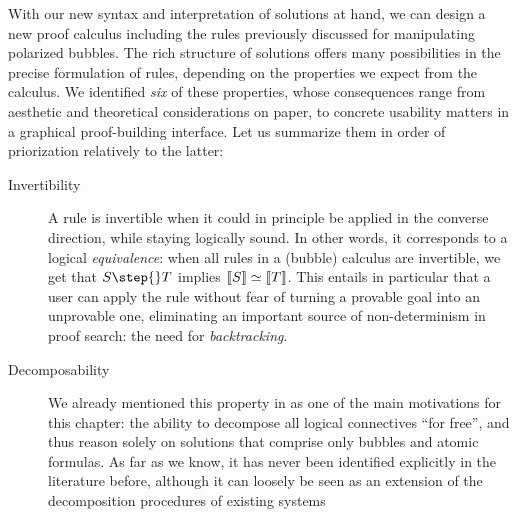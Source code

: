 With our new syntax and interpretation of solutions at hand, we can design a new
proof calculus including the rules previously discussed for manipulating
polarized bubbles. The rich structure of solutions offers many possibilities in
the precise formulation of rules, depending on the properties we expect from the
calculus. We identified \emph{six} of these properties, whose consequences range
from aesthetic and theoretical considerations on paper, to concrete usability
matters in a graphical proof-building interface. Let us summarize them in order
of priorization relatively to the latter:
\begin{description}
  \item[Invertibility]
    A rule is invertible when it could in principle be applied in the converse
    direction, while staying logically sound. In other words, it corresponds to
    a logical \emph{equivalence}: when all rules in a (bubble) calculus are
    invertible, we get that $S \step{} T$ implies $\left\llbracket S \right\rrbracket \simeq
    \left\llbracket T \right\rrbracket$. This entails in particular that a user can apply the rule
    without fear of turning a provable goal into an unprovable
    one, eliminating an important source of
    non-determinism in proof search: the need for
    \emph{backtracking}.
  \item[Decomposability]
    We already mentioned this property in  as one of the
    main motivations for this chapter: the ability to decompose all logical
    connectives ``for free'', and thus reason solely on solutions that comprise
    only bubbles and atomic formulas. As far as we know, it has never been
    identified explicitly in the literature before, although it can loosely be
    seen as an extension of the decomposition procedures of existing  systems
\end{description}

